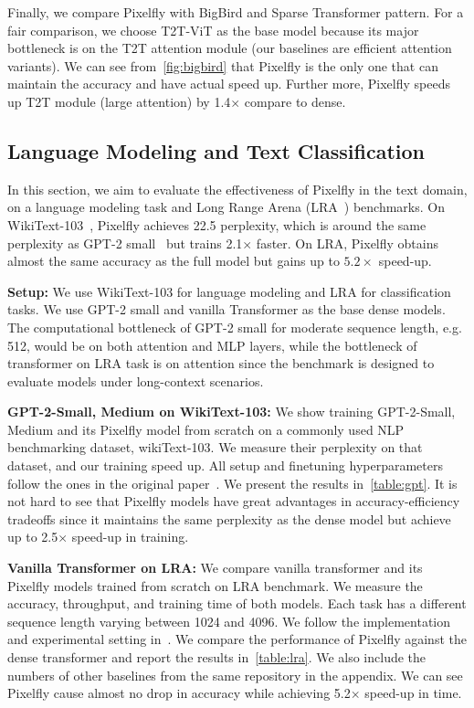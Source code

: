 Finally, we compare Pixelfly with BigBird and Sparse Transformer pattern. For a fair comparison, we choose T2T-ViT as the base model because its major bottleneck is on the T2T attention module (our baselines are efficient attention variants). We can see from~\ref{fig:bigbird} that Pixelfly is the only one that can maintain the accuracy and have actual speed up. Further more, Pixelfly speeds up T2T module (large attention) by 1.4$\times$ compare to dense.

\subsection{Language Modeling and Text Classification}
\label{exp:lm}

In this section, we aim to evaluate the effectiveness of Pixelfly in the text domain, on a language modeling task and Long Range Arena (LRA~\citep{tay2020long}) benchmarks. On WikiText-103~\citep{merity2016pointer}, Pixelfly achieves 22.5 perplexity, which is around the same perplexity as GPT-2 small~\citep{radford2019language} but trains 2.1$\times$ faster. On LRA, Pixelfly obtains almost the same accuracy as the full model but gains up to $5.2\times$ speed-up.

\textbf{Setup:} We use WikiText-103 for language modeling and LRA for classification tasks. We use GPT-2 small and vanilla Transformer as the base dense models. The computational bottleneck of GPT-2 small for moderate sequence length, e.g. 512, would be on both attention and MLP layers, while the bottleneck of transformer on LRA task is on attention since the benchmark is designed to evaluate models under long-context scenarios. 

\textbf{GPT-2-Small, Medium on WikiText-103:} We show training GPT-2-Small, Medium and its Pixelfly model from scratch on a commonly used NLP benchmarking dataset, wikiText-103. We measure their perplexity on that dataset, and our training speed up. All setup and finetuning hyperparameters follow the ones in the original paper~\citep{radford2019language}. We present the results in~\ref{table:gpt}. It is not hard to see that Pixelfly models have great advantages in accuracy-efficiency tradeoffs since it maintains the same perplexity as the dense model but achieve up to 2.5$\times$ speed-up in training.

\textbf{Vanilla Transformer on LRA:} We compare vanilla transformer and its Pixelfly models trained from scratch on LRA benchmark. We measure the accuracy, throughput, and training time of both models. Each task has a different sequence length varying between 1024 and 4096. We follow the implementation and experimental setting in~\citep{xiong2021nystr}. We compare the performance of Pixelfly against the dense transformer and report the results in~\ref{table:lra}. We also include the numbers of other baselines from the same repository in the appendix. We can see Pixelfly cause almost no drop in accuracy while achieving 5.2$\times$ speed-up in time.

